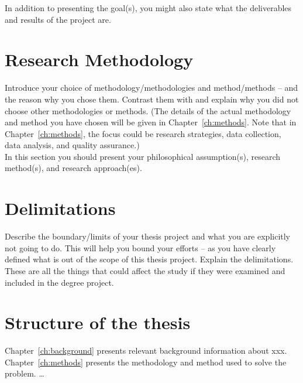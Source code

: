 In addition to presenting the goal(s), you might also state what the deliverables and results of the project are.

\section{Research Methodology}
Introduce your choice of methodology/methodologies and method/methods – and the reason why you chose them. Contrast them with and explain why you did not choose other methodologies or methods. (The details of the actual methodology and method you have chosen will be given in Chapter~\ref{ch:methods}. Note that in Chapter~\ref{ch:methods}, the focus could be research strategies, data collection, data analysis, and quality assurance.)\\
In this section you should present your philosophical assumption(s), research method(s), and research approach(es).

\section{Delimitations}
Describe the boundary/limits of your thesis project and what you are explicitly not going to do. This will help you bound your efforts – as you have clearly defined what is out of the scope of this thesis project. Explain the delimitations. These are all the things that could affect the study if they were examined and included in the degree project.

\section{Structure of the thesis}
Chapter~\ref{ch:background} presents relevant background information about xxx.  Chapter~\ref{ch:methods} presents the methodology and method used to solve the problem. …

